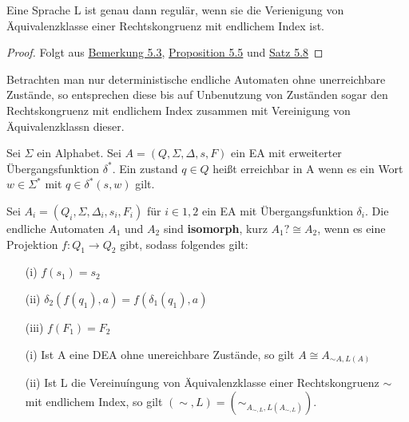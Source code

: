   Eine Sprache L ist genau dann regulär, wenn sie die Verienigung von Äquivalenzklasse einer Rechtskongruenz mit endlichem Index ist. 
  \begin{proof}
    Folgt aus \hyperref[subsec:5.3]{Bemerkung 5.3}, \hyperref[subsec:5.5]{Proposition 5.5} und \hyperref[subsec:5.8]{Satz 5.8}
  \end{proof}
  Betrachten man nur deterministische endliche Automaten ohne unerreichbare Zustände, so entsprechen diese bis auf Unbenutzung von Zuständen sogar den Rechtskongruenz mit endlichem Index zusammen mit Vereinigung von Äquivalenzklassn dieser.

  Sei \(\Sigma\) ein Alphabet. Sei \(A = (Q, \Sigma, \Delta, s, F)\) ein EA mit erweiterter Übergangsfunktion \(\delta^{*}\). Ein zustand \(q\in Q\) heißt erreichbar in A wenn es ein Wort \(w \in \Sigma ^{*}\) mit \(q\in \delta^{*}(s, w)\) gilt.

  Sei \(A_{i} = (Q_{i}, \Sigma, \Delta_{i}, s_{i}, F_{i})\) für \(i \in {1,2}\) ein EA mit Übergangsfunktion \(\delta_{i}\). Die endliche Automaten \(A_{1}\) und \(A_{2}\) sind \textbf{isomorph}, kurz \(A_{1}? \cong A_{2}\), wenn es eine Projektion \(f:Q_{1}\rightarrow Q_{2}\) gibt, sodass folgendes gilt:
  \begin{itemize}
    \item [(i)] \(f(s_{1}) = s_{2}\)
    \item [(ii)] \(\delta_{2}(f(q_{1}), a) = f(\delta_{1}(q_{1}), a)\)
    \item [(iii)] \(f(F_1) = F_2\)
  \end{itemize}

  \begin{itemize}
    \item [(i)] Ist A eine DEA ohne unereichbare Zustände, so gilt \(A \cong A_{\sim A, L(A)}\)
    \item [(ii)] Ist L die Vereinuíngung von Äquivalenzklasse einer Rechtskongruenz \(\sim\) mit endlichem Index, so gilt \((\sim, L) = (\sim_{A_{\sim, L}, L(A_{\sim, L})})\).
  \end{itemize}

